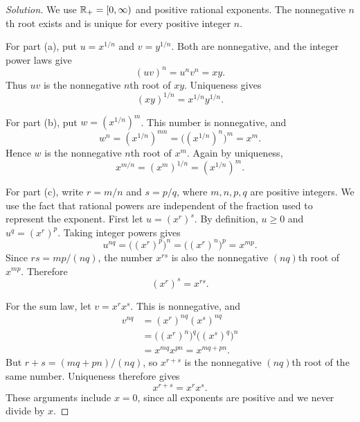 \begin{proof}[Solution]
  We use $\mathbb{R}_+=[0,\infty)$ and positive rational exponents. The
  nonnegative $n$th root exists and is unique for every positive
  integer $n$.

  For part (a), put $u=x^{1/n}$ and $v=y^{1/n}$. Both are nonnegative,
  and the integer power laws give
  \[
    (uv)^n=u^nv^n=xy.
  \]
  Thus $uv$ is the nonnegative $n$th root of $xy$. Uniqueness gives
  \[
    (xy)^{1/n}=x^{1/n}y^{1/n}.
  \]

  For part (b), put $w=(x^{1/n})^m$. This number is nonnegative, and
  \[
    w^n=(x^{1/n})^{mn}=\bigl((x^{1/n})^n\bigr)^m=x^m.
  \]
  Hence $w$ is the nonnegative $n$th root of $x^m$. Again by
  uniqueness,
  \[
    x^{m/n}=(x^m)^{1/n}=(x^{1/n})^m.
  \]

  For part (c), write $r=m/n$ and $s=p/q$, where $m,n,p,q$ are
  positive integers. We use the fact that rational powers are
  independent of the fraction used to represent the exponent.
  First let $u=(x^r)^s$. By definition, $u\geq0$ and
  $u^q=(x^r)^p$. Taking integer powers gives
  \[
    u^{nq}=\bigl((x^r)^p\bigr)^n
      =\bigl((x^r)^n\bigr)^p=x^{mp}.
  \]
  Since $rs=mp/(nq)$, the number $x^{rs}$ is also the nonnegative
  $(nq)$th root of $x^{mp}$. Therefore
  \[
    (x^r)^s=x^{rs}.
  \]

  For the sum law, let $v=x^rx^s$. This is nonnegative, and
  \begin{align*}
    v^{nq}
      &=(x^r)^{nq}(x^s)^{nq} \\
      &=\bigl((x^r)^n\bigr)^q\bigl((x^s)^q\bigr)^n \\
      &=x^{mq}x^{pn}=x^{mq+pn}.
  \end{align*}
  But $r+s=(mq+pn)/(nq)$, so $x^{r+s}$ is the nonnegative $(nq)$th
  root of the same number. Uniqueness therefore gives
  \[
    x^{r+s}=x^rx^s.
  \]
  These arguments include $x=0$, since all exponents are positive
  and we never divide by $x$.
\end{proof}
